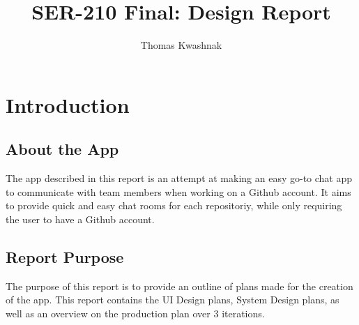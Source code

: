 \documentclass{report}
\title{SER-210 Final: Design Report}
\author{Thomas Kwashnak}
\begin{document}
\maketitle

\tableofcontents
\newpage

\chapter{Introduction}

\section{About the App}
The app described in this report is an attempt at making an easy go-to chat app to communicate with team members when working on a Github account. It aims to provide quick and easy chat rooms for each repositoriy, while only requiring the user to have a Github account.

\section{Report Purpose}
The purpose of this report is to provide an outline of plans made for the creation of the app. This report contains the UI Design plans, System Design plans, as well as an overview on the production plan over 3 iterations.

\newpage
\end{document}
